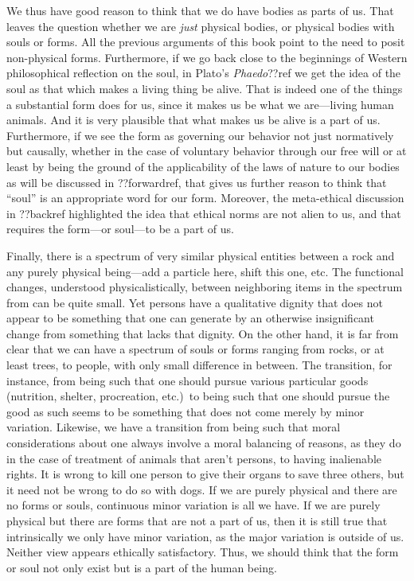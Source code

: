 We thus have good reason to think that we do have bodies as parts of us. That leaves the question whether
we are \textit{just} physical bodies, or physical bodies with souls or forms. All the previous arguments of this
book point to the need to posit non-physical forms. Furthermore, if we go back close to the beginnings of Western philosophical
reflection on the soul, in Plato's \textit{Phaedo}??ref we get the idea of the soul as that which makes a
living thing be alive. That is indeed one of the things a substantial form does for us, since it makes us be
what we are---living human animals. And it is very plausible that what makes us be alive is a part of us. 
Furthermore, if we see the form as governing our behavior not just normatively
but causally, whether in the case of voluntary behavior through our free will or at least by being the ground of
the applicability of the laws of nature to our bodies as will be discussed in ??forwardref, that gives us further
reason to think that ``soul'' is an appropriate word for our form. Moreover, the meta-ethical discussion in ??backref
highlighted the idea that ethical norms are not alien to us, and that requires the form---or soul---to be a 
part of us. 

Finally, there is a spectrum of very similar physical entities between a rock and any 
purely physical being---add a particle here, shift this one, etc. The functional changes, understood 
physicalistically, between neighboring items in the spectrum from can be quite small. Yet persons have 
a qualitative dignity that does not appear to be something that one can generate by an otherwise 
insignificant change from something that lacks that dignity. On the other hand, it is far from clear that 
we can have a spectrum of souls or forms ranging from rocks, or at least trees, to people, with only 
small difference in between. The transition, for instance, from being such that one should pursue various
particular goods (nutrition, shelter, procreation, etc.)\ to being such that one should pursue the good as 
such seems to be something that does not come merely by minor variation. Likewise, we have a transition from 
being such that moral considerations about one always involve a moral balancing of reasons, as they do in
the case of treatment of animals that aren't persons, to having inalienable rights. It is wrong to kill one
person to give their organs to save three others, but it need not be wrong to do so with dogs. 
 If we are purely physical and 
there are no forms or souls, continuous minor variation is all we have. If we are purely physical but there are
forms that are not a part of us, then it is still true that intrinsically we only have minor variation, 
as the major variation is outside of us. Neither view appears ethically satisfactory. Thus, we should think that the form or soul not only exist
but is a part of the human being.


